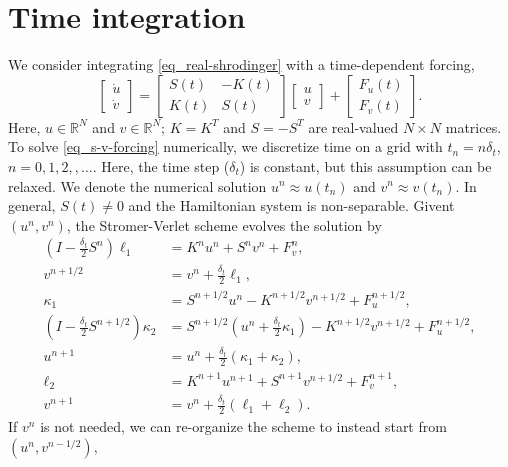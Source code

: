 \documentclass[11pt]{article}
\begin{document}
\section{Time integration}
We consider integrating \eqref{eq_real-shrodinger} with a time-dependent forcing,
\begin{equation}\label{eq_s-v-forcing}
  \begin{bmatrix} \dot{u}\\ \dot{v} \end{bmatrix} =
%
  \begin{bmatrix}
    S(t) & -K(t) \\ K(t) & S(t)
  \end{bmatrix}     
  \begin{bmatrix} u\\ v \end{bmatrix}
  + \begin{bmatrix} F_u(t) \\ F_v(t) \end{bmatrix}.
\end{equation}
Here, $u\in \mathbb{R}^N$ and $v\in \mathbb{R}^N$; $K=K^T$ and $S=-S^T$ are real-valued $N\times N$
matrices.  To solve \eqref{eq_s-v-forcing} numerically, we discretize time on a grid with $t_n = n
\delta_t$, $n=0,1,2,,\ldots$. Here, the time step ($\delta_t$) is constant, but this assumption can
be relaxed. We denote the numerical solution $u^n\approx u(t_n)$ and $v^n\approx v(t_n)$.  In
general, $S(t)\ne0$ and the Hamiltonian system is non-separable. Givent $(u^n, v^n)$, the 
Stromer-Verlet scheme evolves the solution by
\begin{align*}
  \left(I - \frac{\delta_t}{2} S^{n}\right) \ell_1 &= K^n u^n + S^n v^n + F_v^n,\\
%
  v^{n+1/2} &= v^n + \frac{\delta_t}{2}\ell_1,\\
  \kappa_1 &= S^{n+1/2} u^n - K^{n+1/2} v^{n+1/2} +
  F_u^{n+1/2},\\
%
  \left(I - \frac{\delta_t}{2} S^{n+1/2}\right) \kappa_2 &= S^{n+1/2}\left( u^n + \frac{\delta_t}{2}
  \kappa_1 \right) - K^{n+1/2}  v^{n+1/2} + F_u^{n+1/2},\\
  u^{n+1} &= u^n + \frac{\delta_t}{2}\left( \kappa_1 + \kappa_2 \right),\\
%
  \ell_2 &= K^{n+1} u^{n+1} + S^{n+1}  v^{n+1/2} + F_v^{n+1},\\
  v^{n+1} &= v^n + \frac{\delta_t}{2}\left( \ell_1 + \ell_2 \right).
\end{align*}
If $v^n$ is not needed, we can re-organize the scheme to instead start from $(u^n, v^{n-1/2})$,
\end{document}
